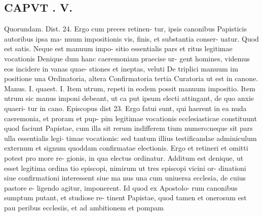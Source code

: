 \documentclass{article}
\begin{document}
\begin{pages}
\section*{CAPVT . V. }
\marginpar{[ p.361 ]}Quorundam. Dist. 24. Ergo cum preces retinen- tur, ipsis canonibus Papisticis autoribus ipsa ma- nuum impositionis vis, finis, et substantia conser- uatur. Quod est satis. Neque est manuum impo- sitio essentialis pars et ritus legitimae vocationis Denique dum hanc caeremoniam praecise ur- gent homines, videmus eos incidere in vanas quae- stiones et ineptas, veluti De triplici manuum im positione una Ordinatoria, altera Confirmatoria tertia Curatoria ut est in canone. Manus. I. quaest. I. Item utrum, repeti in eodem possit manuum impositio. Item utrum sic manus imponi debeant, ut ca put ipsum electi attingant, de quo anxie quaeri- tur in cano. Episcopus dist 23. Ergo fatui sunt, qui haerent in ea nuda caeremonia, et proram et pup- pim legitimae vocationis ecclesiasticae constituunt quod faciunt Papistae, cum illa sit rerum indifferem tium numero:neque sit pars ulla essentialis legi- timae vocationis: sed tantum illius testificandae adminiculum externum et signum quoddam confirmatae electionis. Ergo et retineri et omitti potest pro more re- gionis, in qua electus ordinatur. Additum est denique, ut esset legitima ordina tio episcopi, nimirum ut tres episcopi vicini or- dinationi siue confirmationi interessent siue ma nus una cum uniuersa ecclesia, de cuius pastore e- ligendo agitur, imponerent. Id quod ex Apostolo- rum canonibus sumptum putant, et studiose re- tinent Papistae, quod tamen et onerosum est pau peribus ecclesiis, et ad ambitionem et pompam 

\end{pages}
\end{document}
